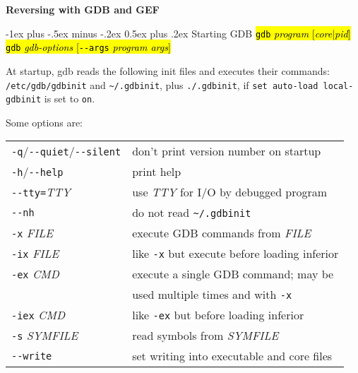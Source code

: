 \documentclass[a4paper,landscape]{article}
\makeatletter
\renewcommand{\section}{\@startsection{section}{1}{0mm}%
                                {-1ex plus -.5ex minus -.2ex}%
                                {0.5ex plus .2ex}%
                                {\normalfont\large\bfseries}}
\makeatother
\begin{document}
\footnotesize
\begin{multicols*}{3}
\setlength{\premulticols}{1pt}
\setlength{\postmulticols}{1pt}
\setlength{\multicolsep}{1pt}
\setlength{\columnsep}{2pt}

\begin{center}
     \Large{\textbf{Reversing with GDB and GEF}} \\
\end{center}

\section{Starting GDB}
\hl{\texttt{gdb}\textit{ program }[\textit{core}|\textit{pid}]} \\
\hl{\texttt{gdb}\textit{ gdb-options }[\texttt{-{}-args}\textit{ program args}]}

At startup, gdb reads the following init files and executes their commands:
\texttt{/etc/gdb/gdbinit} and \texttt{\textasciitilde/.gdbinit}, plus \texttt{./.gdbinit},
if \texttt{set auto-load local-gdbinit} is set to \texttt{on}.

Some options are:\\
\begin{tabular}{@{}ll@{}}
\texttt{-q}/\texttt{-{}-quiet}/\texttt{-{}-silent} & don't print version number on startup \\
\texttt{-h}/\texttt{-{}-help} & print help \\
\texttt{-{}-tty=}\textit{TTY} & use \textit{TTY} for I/O by debugged program \\
\texttt{-{}-nh} & do not read \texttt{\textasciitilde/.gdbinit} \\
\texttt{-x}\textit{ FILE} & execute GDB commands from \textit{FILE} \\
\texttt{-ix}\textit{ FILE} & like \texttt{-x} but execute before loading inferior \\
\texttt{-ex}\textit{ CMD} & execute a single GDB command; may be \\ & used multiple times and with \texttt{-x} \\
\texttt{-iex}\textit{ CMD} & like \texttt{-ex} but before loading inferior \\
\texttt{-s}\textit{ SYMFILE} & read symbols from \textit{SYMFILE} \\
\texttt{-{}-write} & set writing into executable and core files \\
\end{tabular}


\end{multicols*}
\end{document}
